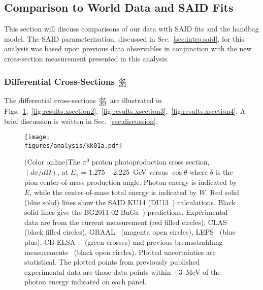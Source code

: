 \subsection{Comparison to World Data and SAID Fits}\label{sec:results.conclusion}
This section will discuss comparisons of our data with SAID fits and the  handbag model. The SAID parameterization, discussed in Sec.~\ref{sec:intro.said}, for this analysis was based upon previous data observables in conjunction with the new cross-section measurement presented in this analysis.

\subsubsection{Differential Cross-Sections $\frac{\lowercase{d}\sigma}{\lowercase{d}\Omega}$}\label{diffXsection}
The differential cross-sections $\frac{\lowercase{d}\sigma}{\lowercase{d}\Omega}$ are illustrated in Figs.~\ref{fig:results.xsection1},~\ref{fig:results.xsection2},~\ref{fig:results.xsection3},~\ref{fig:results.xsection4}. A brief discussion is written in Sec.~\ref{sec:discussion}.
\begin{figure}[h!]\begin{center}
\texttt{[image: \\figures/analysis/kk01a.pdf]}%
\caption[The $\pi^0$ proton photoproduction cross section, $(d\sigma/d\Omega)$, at $E_{\gamma}$ = 1.275 -- 2.225~GeV versus $\cos\theta$ where $\theta$ is the pion center-of-mass production angle]{\label{fig:results.xsection1}(Color online)The $\pi^0$ proton photoproduction cross section, $(d\sigma/d\Omega)$, at $E_{\gamma}$ = 1.275 -- 2.225~GeV versus $\cos\theta$ where $\theta$ is the pion center-of-mass production angle. Photon energy is indicated by $E$, while the center-of-mass total energy is indicated by $W$. Red solid (blue solid) lines show the SAID KU14 (DU13~\protect\cite{Dugger13}) calculations. Black solid lines give the BG2011-02 BnGa~\protect\cite{BonnGat}) predictions. Experimental data are from the current measurement (red filled circles), CLAS~\protect\cite{Dugger07} (black filled circles), GRAAL~\protect\cite{Graal} (magenta open circles), LEPS~\protect\cite{LEPS} (blue plus), CB-ELSA~\protect\cite{ELSA05}~\cite{ELSA11} (green crosses) and previous bremsstrahlung measurements~\protect\cite{brem} (black open circles). Plotted uncertainties are statistical. The plotted points from previously published experimental data are those data points within $\pm$3~MeV of the photon energy indicated on each panel.}
\end{center}\end{figure} 

